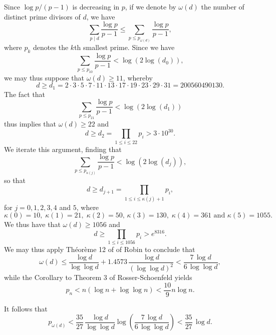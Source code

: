 Since $\log p/ (p-1)$ is decreasing in $p$, if we denote by $\omega (d)$ the number of distinct prime divisors of $d$, we have
\begin{equation} \label{ome}
\sum_{p\mid d} \frac{\log p}{p-1} \leq \sum_{p \leq p_{\omega (d)}} \frac{\log p}{p-1},
\end{equation}
where $p_k$ denotes the $k$th smallest prime. Since we have
$$
 \sum_{p \leq p_{10}} \frac{\log p}{p-1} < \log (2 \log (d_0)),
 $$
 we may thus suppose that $\omega (d) \geq 11$, whereby 
 $$
 d \geq d_1 = 2 \cdot 3 \cdot 5 \cdot 7 \cdot 11 \cdot 13 \cdot 17 \cdot 19 \cdot 23 \cdot 29 \cdot 31 = 200560490130.
$$
The fact that
$$
 \sum_{p \leq p_{21}} \frac{\log p}{p-1} < \log (2 \log (d_1))
 $$
 thus implies that $\omega (d) \geq 22$ and
 $$
 d \geq d_2 = \prod_{1 \leq i \leq 22} p_i > 3 \cdot 10^{30}.
 $$
 We iterate this argument, finding that
 $$
 \sum_{p \leq p_{\kappa (j)}} \frac{\log p}{p-1} < \log (2 \log (d_j)),
 $$
 so that 
 $$
 d \geq d_{j+1} = \prod_{1 \leq i \leq \kappa (j) + 1} p_i,
 $$
for $j=0, 1, 2, 3, 4$ and $5$, where
 $$
 \kappa (0)=10, \; \kappa (1) = 21, \; \kappa (2) = 50, \, \kappa (3) = 130, \; \kappa (4) = 361 \mbox{ and } \kappa (5) = 1055.
 $$
We thus have that $\omega (d) \geq 1056$ and 
$$
d \geq \prod_{1 \leq i \leq 1056} p_i > e^{8316}.
$$
We may thus apply Th\'eor\`eme 12 of  of Robin \cite{Ro} to conclude that
$$
\omega (d) \leq \frac{\log d}{\log \log d} + 1.4573 \, \frac{\log d}{(\log \log d)^2}  <  \frac{7 \, \log d}{6 \, \log \log d},
$$
while the Corollary to Theorem 3 of Rosser-Schoenfeld yields 
$$
p_n < n (\log n + \log \log n) < \frac{10}{9} n \log n.
$$

It follows that
$$
p_{\omega (d)} < \frac{35}{27} \, \frac{\log d}{\log \log d} \log \left(  \frac{7 \, \log d}{6 \, \log \log d} \right) <  \frac{35}{27} \, \log d.
$$


